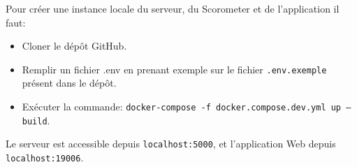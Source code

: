 Pour créer une instance locale du serveur, du Scorometer et de l’application il faut:

\begin{itemize}
	\item Cloner le dépôt GitHub.
	\item Remplir un fichier .env en prenant exemple sur le fichier \verb|.env.exemple| présent dans le dépôt.
	\item Exécuter la commande: \verb|docker-compose -f docker.compose.dev.yml up –build|.
\end{itemize}


Le serveur est accessible depuis \verb|localhost:5000|, et l’application Web depuis \verb|localhost:19006|.

